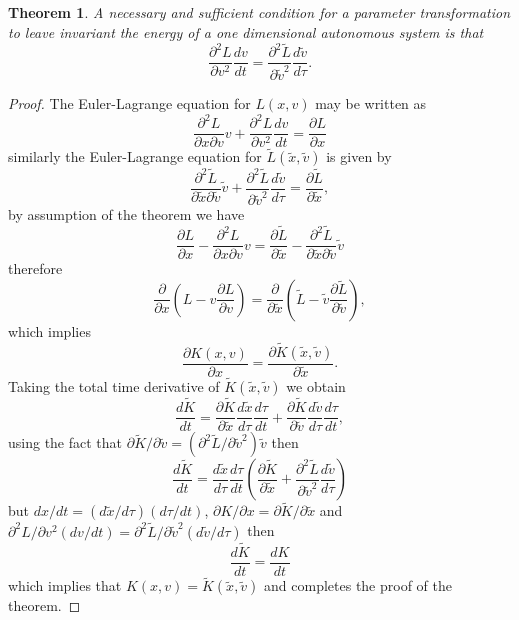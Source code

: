 \newtheorem{ein}{Theorem}
\begin{ein}
A necessary and sufficient condition for a parameter
transformation to leave invariant the energy of a one dimensional
autonomous system is that \\
\[ \frac{\partial^{2}L}{\partial v^2}\frac{dv}{dt}=\frac{\partial^{2}\tilde{L}}
{\partial \tilde{v}^2}\frac{d\tilde{v}}{d\tau}. \]
\end{ein}

\newtheorem{proof}{Proof}
\begin{proof}

The Euler-Lagrange equation for $L(x,v)$ may be written as
\[
\frac{\partial^{2}L}{\partial x\partial
v}v+\frac{\partial^{2}L}{\partial v^2}\frac{dv}{dt}=\frac{\partial
L }{\partial x}
\]
similarly the Euler-Lagrange equation for
$\tilde{L}(\tilde{x},\tilde{v})$ is given by
\[
\frac{\partial^{2}\tilde{L}}{\partial \tilde{x}\partial
\tilde{v}}\tilde{v}+\frac{\partial^{2}\tilde{L}}{\partial
\tilde{v}^2}\frac{d\tilde{v}}{d\tau}=\frac{\partial \tilde{L}
}{\partial \tilde{x}},
\]
by assumption of the theorem we have
\[
\frac{\partial L }{\partial x}-\frac{\partial^{2}L}{\partial
x\partial v}v=\frac{\partial \tilde{L} }{\partial
\tilde{x}}-\frac{\partial^{2}\tilde{L}}{\partial \tilde{x}\partial
\tilde{v}}\tilde{v}
\]
therefore
\[
\frac{\partial}{\partial x}\left(L-v\frac{\partial L }{\partial v}
\right)= \frac{\partial}{\partial
\tilde{x}}\left(\tilde{L}-\tilde{v}\frac{\partial \tilde{L}
}{\partial \tilde{v}} \right),
\]
which implies
\[
\frac{\partial K(x,v)}{\partial
x}=\frac{\partial\tilde{K}(\tilde{x},\tilde{v})}{\partial
\tilde{x}}.
\]
Taking the total time derivative of
$\tilde{K}(\tilde{x},\tilde{v})$ we obtain
\[
\frac{d\tilde{K}}{dt}=\frac{\partial\tilde{K}}{\partial
\tilde{x}}\frac{d\tilde{x}}{d\tau}\frac{d\tau}{dt}+\frac{\partial\tilde{K}}{\partial
\tilde{v}}\frac{d\tilde{v}}{d\tau}\frac{d\tau}{dt},
\]
using the fact that $\partial
\tilde{K}/\partial\tilde{v}=(\partial ^{2}\tilde{L}/\partial
\tilde{v}^{2})\tilde{v}$ then
\[
\frac{d\tilde{K}}{dt}=\frac{d\tilde{x}}{d\tau}\frac{d\tau}{dt}\left(\frac{\partial
\tilde{K}}{\partial\tilde{x}}+\frac{\partial^{2}\tilde{L}}
{\partial \tilde{v}^2}\frac{d\tilde{v}}{d\tau} \right)
\]
but $dx/dt=(d\tilde{x}/d\tau)(d\tau/dt)$, $\partial K/\partial
x=\partial\tilde{K}/\partial \tilde{x}$ and $\partial
^{2}L/\partial v^{2}(dv/dt)=\partial ^{2}\tilde{L}/\partial
\tilde{v}^{2}(d\tilde{v}/d\tau)$ then
\[
\frac{d\tilde{K}}{dt}=\frac{dK}{dt}
\]
which implies that $K(x,v)=\tilde{K}(\tilde{x},\tilde{v})$ and
completes the proof of the theorem.

\end{proof}

